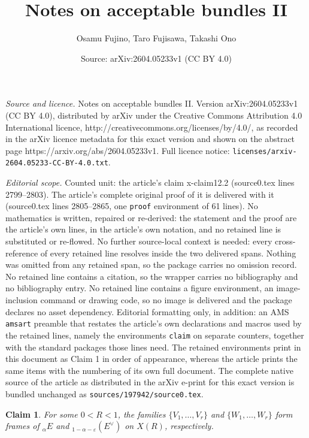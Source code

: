 \documentclass[10pt,a4paper]{amsart}
\title{Notes on acceptable bundles II}
\author{Osamu Fujino, Taro Fujisawa, Takashi Ono}
\date{Source: arXiv:2604.05233v1 (CC BY 4.0)}
\newtheorem{claim}{Claim}
\begin{document}
\maketitle

\noindent\emph{Source and licence.} Notes on acceptable bundles II. Version arXiv:2604.05233v1 (CC BY 4.0), distributed by arXiv under the Creative Commons Attribution 4.0 International licence, http://creativecommons.org/licenses/by/4.0/, as recorded in the arXiv licence metadata for this exact version and shown on the abstract page https://arxiv.org/abs/2604.05233v1. Full licence notice: \texttt{licenses/arxiv-2604.05233-CC-BY-4.0.txt}.\par\smallskip

\noindent\textit{Editorial scope.} Counted unit: the article's claim x-claim12.2 (source0.tex lines 2799--2803). The article's complete original proof of it is delivered with it (source0.tex lines 2805--2865, one \texttt{proof} environment of 61 lines). No mathematics is written, repaired or re-derived: the statement and the proof are the article's own lines, in the article's own notation, and no retained line is substituted or re-flowed.  No further source-local context is needed: every cross-reference of every retained line resolves inside the two delivered spans.  Nothing was omitted from any retained span, so the package carries no omission record.  No retained line contains a citation, so the wrapper carries no bibliography and no bibliography entry.  No retained line contains a figure environment, an image-inclusion command or drawing code, so no image is delivered and the package declares no asset dependency.  Editorial formatting only, in addition: an AMS \texttt{amsart} preamble that restates the article's own declarations and macros used by the retained lines, namely the environments \texttt{claim} on separate counters, together with the standard packages those lines need.  The retained environments print in this document as Claim 1 in order of appearance, whereas the article prints the same items with the numbering of its own full document.  The complete native source of the article as distributed in the arXiv e-print for this exact version is bundled unchanged as \texttt{sources/197942/source0.tex}.
\begin{claim}\label{x-claim12.2}
For some $0<R<1$, the families $\{V_1,\ldots,V_r\}$ and
$\{W_1,\ldots,W_r\}$ form frames of ${}_\alpha E$ and
${}_{1-\alpha-\varepsilon}(E^\vee)$ on $X(R)$, respectively.
\end{claim}
\end{document}
